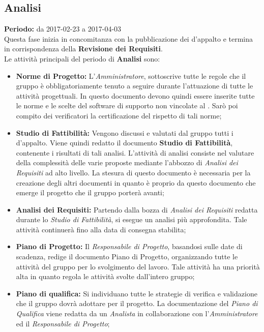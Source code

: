	\subsection{Analisi}
	\textbf{Periodo:} da 2017-02-23 a 2017-04-03 \\
	Questa fase inizia in concomitanza con la pubblicazione dei  d'appalto e termina in 		 corrispondenza della \textbf{Revisione dei Requisiti}. \\
	Le attività principali del periodo di \textbf{Analisi} sono: \\
	\begin{itemize}
		\item \textbf{Norme di Progetto:} L'\textit{Amministratore}, sottoscrive tutte le regole che il gruppo è obbligatoriamente tenuto a seguire durante l'attuazione di tutte le attività progettuali. In questo documento devono quindi essere inserite tutte le norme e le scelte del software di supporto non vincolate al . Sarò poi compito dei verificatori la certificazione del rispetto di tali norme;
		\item \textbf{Studio di Fattibilità:} Vengono discussi e valutati dal gruppo tutti i  d'appalto. Viene quindi redatto il documento \textbf{Studio di Fattibilità}, contenente i risultati di tali analisi. L'attività di analisi consiste nel valutare della complessità delle varie proposte mediante l'abbozzo di \textit{Analisi dei Requisiti} ad alto livello. La stesura di questo documento è necessaria per la creazione degli altri documenti in quanto è proprio da questo documento che emerge il progetto che il gruppo porterà avanti;
		\item \textbf{Analisi dei Requisiti:} Partendo dalla bozza di \textit{Analisi dei Requisiti} redatta durante lo \textit{Studio di Fattibilità}, si esegue un analisi più approfondita. Tale attività continuerà fino alla data di consegna stabilita;
		\item \textbf{Piano di Progetto:} Il \textit{Responsabile di Progetto}, basandosi sulle date di scadenza, redige il documento Piano di Progetto, organizzando tutte le attività del gruppo per lo svolgimento del lavoro. Tale attività ha una priorità alta in quanto regola le attività svolte dall'intero gruppo;
		\item \textbf{Piano di qualifica:} Si individuano tutte le strategie di verifica e validazione che il gruppo dovrà adottare per il progetto. La documentazione del \textit{Piano di Qualifica} viene redatta da un \textit{Analista} in collaborazione con l'\textit{Amministratore} ed il \textit{Responsabile di Progetto};

\end{itemize}

